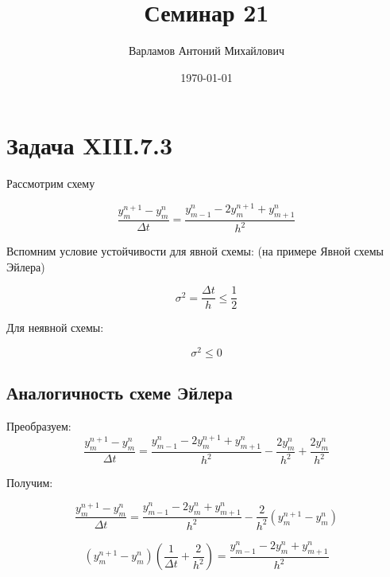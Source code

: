 \documentclass[10pt,a4paper]{article}
\title{Семинар 21}
\date{\today}
\author{Варламов Антоний Михайлович}
\begin{document}
	\maketitle
	
	\section{Задача XIII.7.3}
	
	Рассмотрим схему 
	
	\begin{equation}
		\frac{y^{n + 1}_{m} - y^{n}_{m}}{\Delta t} = \frac{y^{n}_{m - 1} - 2
		y^{n + 1}_{m} + y^{n}_{m + 1}}{h^{2}}
	\end{equation}
	
	Вспомним условие устойчивости для явной схемы: (на примере Явной схемы 
	Эйлера)
	
	\begin{equation}
		\sigma^{2} = \frac{\Delta t}{h} \leqslant \frac{1}{2}
	\end{equation}
	
	Для неявной схемы:
	
	\begin{equation}
		\sigma^{2} \leqslant 0
	\end{equation}
	
	\subsection{Аналогичность схеме Эйлера}
	
	
	Преобразуем:
	\begin{equation}
		\frac{y^{n + 1}_{m} - y^{n}_{m}}{\Delta t} = \frac{y^{n}_{m - 1} - 2
		y^{n + 1}_{m} + y^{n}_{m + 1}}{h^{2}} - \frac{2y^{n}_{m}}{h^{2}} + 
		\frac{2y^{n}_{m}}{h^{2}}
	\end{equation}
	
	Получим:
	
	\begin{equation}
		\frac{y^{n + 1}_{m} - y^{n}_{m}}{\Delta t} = \frac{y^{n}_{m - 1} - 2
		y^{n}_{m} + y^{n}_{m + 1}}{h^{2}} - \frac{2}{h^{2}}\left(
		y^{n + 1}_{m} - y_{m}^{n}\right)
	\end{equation}
	
	\begin{equation}
		\left(y_{m}^{n + 1} - y_{m}^{n}\right)\left(\frac{1}{\Delta t} + 
		\frac{2}{h^{2}}\right) = \frac{y^{n}_{m - 1} - 2
		y^{n}_{m} + y^{n}_{m + 1}}{h^{2}}
	\end{equation}
	
\end{document}
